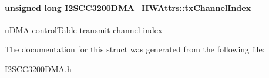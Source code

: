 \paragraph[{tx\+Channel\+Index}]{\setlength{\rightskip}{0pt plus 5cm}unsigned long I2\+S\+C\+C3200\+D\+M\+A\+\_\+\+H\+W\+Attrs\+::tx\+Channel\+Index}\label{struct_i2_s_c_c3200_d_m_a___h_w_attrs_a34608d4786f5b013412cfe07a6f17330}
u\+D\+M\+A control\+Table transmit channel index 

The documentation for this struct was generated from the following file\+:\begin{DoxyCompactItemize}
\item 
\hyperlink{_i2_s_c_c3200_d_m_a_8h}{I2\+S\+C\+C3200\+D\+M\+A.\+h}\end{DoxyCompactItemize}

